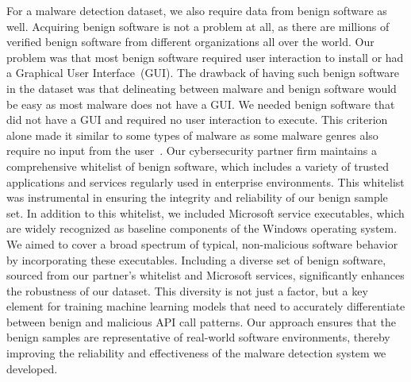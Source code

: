 For a malware detection dataset, we also require data from benign software as well.
Acquiring benign software is not a problem at all, as there are millions of verified benign software from different organizations all over the world.
Our problem was that most benign software required user interaction to install or had a Graphical User Interface~(GUI).
The drawback of having such benign software in the dataset was that delineating between malware and benign software would be easy as most malware does not have a GUI.
We needed benign software that did not have a GUI and required no user interaction to execute.
This criterion alone made it similar to some types of malware as some malware genres also require no input from the user~\cite{gopinath2023comprehensive,bilot2024survey}.
Our cybersecurity partner firm maintains a comprehensive whitelist of benign software, which includes a variety of trusted applications and services regularly used in enterprise environments. This whitelist was instrumental in ensuring the integrity and reliability of our benign sample set. In addition to this whitelist, we included Microsoft service executables, which are widely recognized as baseline components of the Windows operating system. We aimed to cover a broad spectrum of typical, non-malicious software behavior by incorporating these executables.
Including a diverse set of benign software, sourced from our partner's whitelist and Microsoft services, significantly enhances the robustness of our dataset. This diversity is not just a factor, but a key element for training machine learning models that need to accurately differentiate between benign and malicious API call patterns. Our approach ensures that the benign samples are representative of real-world software environments, thereby improving the reliability and effectiveness of the malware detection system we developed.

